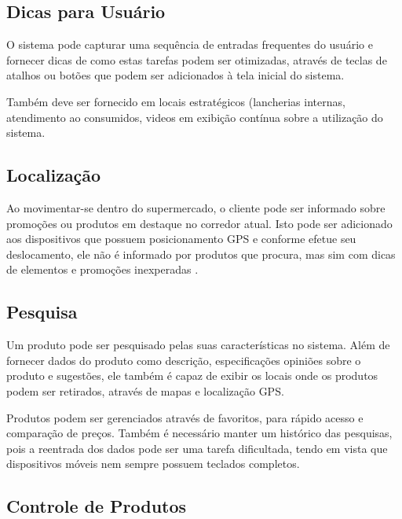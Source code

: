 \documentclass{article}
\begin{document}
\subsection{Dicas para Usuário}


O sistema pode capturar uma sequência de entradas frequentes do usuário e
fornecer dicas de como estas tarefas podem ser otimizadas, através de teclas de
atalhos ou botões que podem ser adicionados à tela inicial do sistema.

Também deve ser fornecido em locais estratégicos (lancherias internas,
atendimento ao consumidos, videos em exibição contínua sobre a utilização do
sistema.

\subsection{Localização}


Ao movimentar-se dentro do supermercado, o cliente pode ser informado sobre
promoções ou produtos em destaque no corredor atual. Isto pode ser adicionado
aos dispositivos que possuem posicionamento GPS e conforme efetue seu
deslocamento, ele não é informado por produtos que procura, mas sim com dicas de
elementos e promoções inexperadas \cite{canny2006}.

\subsection{Pesquisa}


Um produto pode ser pesquisado pelas suas características no sistema. Além de
fornecer dados do produto como descrição, especificações opiniões sobre o
produto e sugestões, ele também é capaz de exibir os locais onde os produtos
podem ser retirados, através de mapas e localização GPS.


Produtos podem ser gerenciados através de favoritos, para rápido acesso e
comparação de preços. Também é necessário manter um histórico das pesquisas,
pois a reentrada dos dados pode ser uma tarefa dificultada, tendo em vista que
dispositivos móveis nem sempre possuem teclados completos.

\subsection{Controle de Produtos}
\end{document}
